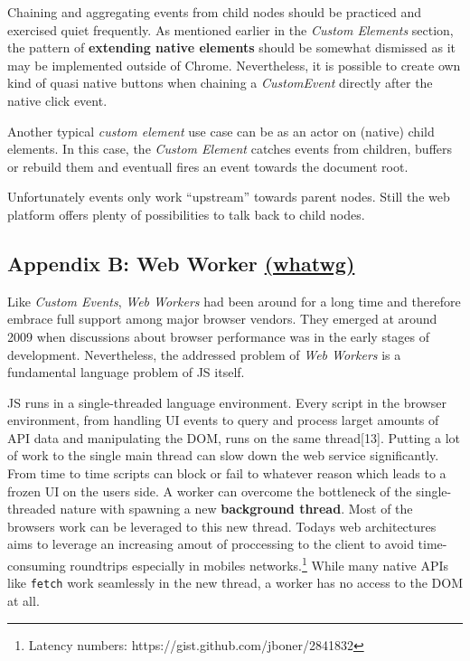 \documentclass[]{assets/latex/ieee}
\begin{document}
Chaining and aggregating events from child nodes should be practiced and
exercised quiet frequently. As mentioned earlier in the \emph{Custom
Elements} section, the pattern of \textbf{extending native elements}
should be somewhat dismissed as it may be implemented outside of Chrome.
Nevertheless, it is possible to create own kind of quasi native buttons
when chaining a \emph{CustomEvent} directly after the native click
event.

Another typical \emph{custom element} use case can be as an actor on
(native) child elements. In this case, the \emph{Custom Element} catches
events from children, buffers or rebuild them and eventuall fires an
event towards the document root.

Unfortunately events only work ``upstream'' towards parent nodes. Still
the web platform offers plenty of possibilities to talk back to child
nodes.

\subsection{\texorpdfstring{Appendix B: Web Worker
\href{https://html.spec.whatwg.org/multipage/workers.html}{(whatwg)}}{Appendix B: Web Worker (whatwg)}}\label{appendix-b-web-worker-whatwg}

Like \emph{Custom Events}, \emph{Web Workers} had been around for a long
time and therefore embrace full support among major browser vendors.
They emerged at around 2009 when discussions about browser performance
was in the early stages of development. Nevertheless, the addressed
problem of \emph{Web Workers} is a fundamental language problem of JS
itself.

JS runs in a single-threaded language environment. Every script in the
browser environment, from handling UI events to query and process larget
amounts of API data and manipulating the DOM, runs on the same
thread{[}13{]}. Putting a lot of work to the single main thread can slow
down the web service significantly. From time to time scripts can block
or fail to whatever reason which leads to a frozen UI on the users side.
A worker can overcome the bottleneck of the single-threaded nature with
spawning a new \textbf{background thread}. Most of the browsers work can
be leveraged to this new thread. Todays web architectures aims to
leverage an increasing amout of proccessing to the client to avoid
time-consuming roundtrips especially in mobiles networks.\footnote{Latency
  numbers: https://gist.github.com/jboner/2841832} While many native
APIs like \texttt{fetch} work seamlessly in the new thread, a worker has
no access to the DOM at all.
\end{document}
